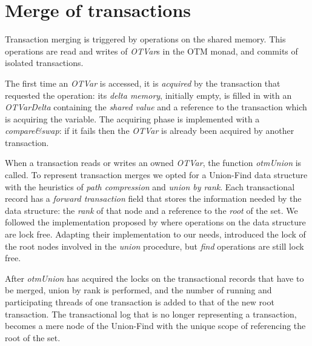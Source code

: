 \section{Merge of transactions}

Transaction merging is triggered by operations on the shared memory.
This operations are read and writes of \emph{OTVar}s in the OTM monad, and commits of isolated transactions.

The first time an \emph{OTVar} is accessed, it is \emph{acquired} by the transaction that requested the operation: its \emph{delta memory}, initially empty, is filled in with an \emph{OTVarDelta} containing the \emph{shared value} and a reference to the transaction which is acquiring the variable.
The acquiring phase is implemented with a \emph{compare\&swap}: if it fails then the \emph{OTVar} is already been acquired by another transaction.

When a transaction reads or writes an owned \emph{OTVar}, the function \emph{otmUnion} is called.
To represent transaction merges we opted for a Union-Find data structure with the heuristics of \emph{path compression} and \emph{union by rank}.
Each transactional record has a \emph{forward transaction} field that stores the information needed by the data structure: the \emph{rank} of that node and a reference to the \emph{root} of the set.
We followed the implementation proposed by \citet{Anderson94wait-freeparallel} where operations on the data structure are lock free.
Adapting their implementation to our needs, introduced the lock of the root nodes involved in the \emph{union} procedure, but \emph{find} operations are still lock free.

After \emph{otmUnion} has acquired the locks on the transactional records that have to be merged, union by rank is performed, and the number of running and participating threads of one transaction is added to that of the new root transaction. The transactional log that is no longer representing a transaction, becomes a mere node of the Union-Find with the unique scope of referencing the root of the set.


